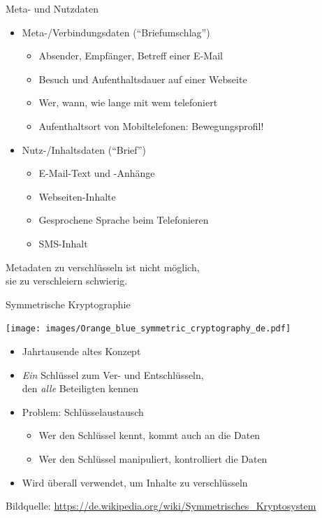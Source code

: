   \begin{frame}{Meta- und Nutzdaten}
    \begin{itemize}
      \item Meta-/Verbindungsdaten (``Briefumschlag'')
      \begin{itemize}
        \item Absender, Empfänger, Betreff einer E-Mail
        \item Besuch und Aufenthaltsdauer auf einer Webseite
        \item Wer, wann, wie lange mit wem telefoniert
        \item Aufenthaltsort von Mobiltelefonen: Bewegungsprofil!
      \end{itemize}
      \item Nutz-/Inhaltsdaten (``Brief'')
      \begin{itemize}
        \item E-Mail-Text und -Anhänge
        \item Webseiten-Inhalte
        \item Gesprochene Sprache beim Telefonieren
        \item SMS-Inhalt
      \end{itemize}
    \end{itemize}

  Metadaten zu verschlüsseln ist nicht möglich,\\ sie zu verschleiern schwierig.
  \end{frame}

  \begin{frame}{Symmetrische Kryptographie}
    \begin{center}
      \texttt{[image: images/Orange\_blue\_symmetric\_cryptography\_de.pdf]}
    \end{center}
    \begin{itemize}
      \item Jahrtausende altes Konzept
      \item \emph{Ein} Schlüssel zum Ver- und Entschlüsseln,\\den \emph{alle} Beteiligten kennen
      \item Problem: Schlüsselaustausch
      \begin{itemize}
        \item Wer den Schlüssel kennt, kommt auch an die Daten
        \item Wer den Schlüssel manipuliert, kontrolliert die Daten
      \end{itemize}
      \item Wird überall verwendet, um Inhalte zu verschlüsseln
    \end{itemize}
    \tiny Bildquelle: \url{https://de.wikipedia.org/wiki/Symmetrisches_Kryptosystem}
  \end{frame}
  
